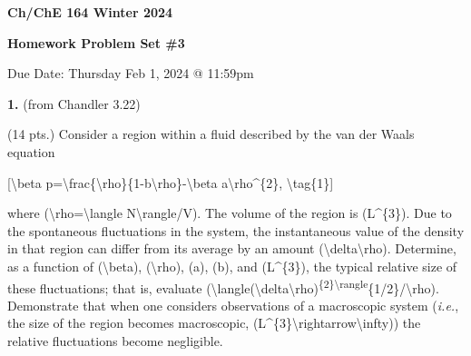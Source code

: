 \textbf{Ch\slash{}ChE 164 Winter 2024}

\textbf{Homework Problem Set \#3}

Due Date: Thursday Feb 1, 2024 @ 11:59pm

\textbf{1.} (from Chandler 3.22)

(14 pts.) Consider a region within a fluid described by the van der Waals equation

[\textbackslash{}beta p=\textbackslash{}frac\{\textbackslash{}rho\}\{1-b\textbackslash{}rho\}-\textbackslash{}beta a\textbackslash{}rho\^{}\{2\}, \textbackslash{}tag\{1\}]

where (\textbackslash{}rho=\textbackslash{}langle N\textbackslash{}rangle\slash{}V). The volume of the region is (L\^{}\{3\}). Due to the spontaneous fluctuations in the system, the instantaneous value of the density in that region can differ from its average by an amount (\textbackslash{}delta\textbackslash{}rho). Determine, as a function of (\textbackslash{}beta), (\textbackslash{}rho), (a), (b), and (L\^{}\{3\}), the typical relative size of these fluctuations; that is, evaluate (\textbackslash{}langle(\textbackslash{}delta\textbackslash{}rho)\textsuperscript{\{2\}\textbackslash{}rangle}\{1\slash{}2\}\slash{}\textbackslash{}rho). Demonstrate that when one considers observations of a macroscopic system (\emph{i.e.}, the size of the region becomes macroscopic, (L\^{}\{3\}\textbackslash{}rightarrow\textbackslash{}infty)) the relative fluctuations become negligible.

